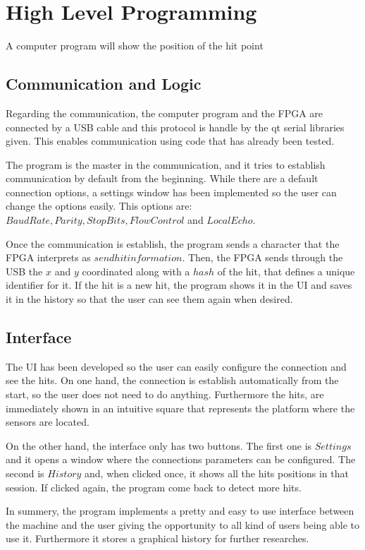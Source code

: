 \chapter{High Level Programming}
\label{chap:high_level_programming}
	A computer program will show the position of the hit point
	\section{Communication and Logic}
	\label{sec:communication_and_logic}
		Regarding the communication, the computer program and the FPGA are connected by a USB cable and this protocol is handle by the qt serial libraries given.
		This enables communication using code that has already been tested.

		The program is the master in the communication, and it tries to establish communication by default from the beginning.
		While there are a default connection options, a settings window has been implemented so the user can change the options easily.
		This options are: $Baud Rate, Parity, Stop Bits, Flow Control$ and $Local Echo$.

		Once the communication is establish, the program sends a character that the FPGA interprets as $send hit information$.
		Then, the FPGA sends through the USB the $x$ and $y$ coordinated along with a $hash$ of the hit, that defines a unique identifier for it.
		If the hit is a new hit, the program shows it in the UI and saves it in the history so that the user can see them again when desired.
	\section{Interface}
	\label{sec:program_interface}
		The UI has been developed so the user can easily configure the connection and see the hits.
		On one hand, the connection is establish automatically from the start, so the user does not need to do anything. Furthermore the hits, are immediately shown in an intuitive square that represents the platform where the sensors are located.

		On the other hand, the interface only has two buttons. The first one is $Settings$ and it opens a window where the connections parameters can be configured. The second is $History$ and, when clicked once, it shows all the hits positions in that session. If clicked again, the program come back to detect more hits.

		In summery, the program implements a pretty and easy to use interface between the machine and the user giving the opportunity to all kind of users being able to use it. Furthermore it stores a graphical history for further researches.

